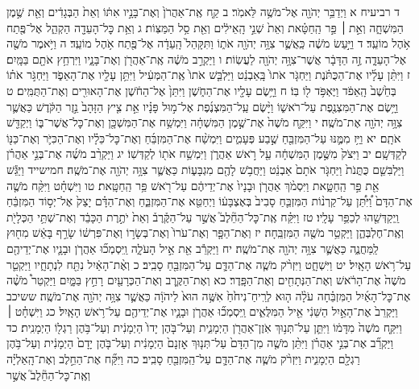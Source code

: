 \documentclass[twoside, openany, parskip=half, 11pt]{book}
\begin{document}
ד רביעיח א וַיְדַבֵּ֥ר יְהֹוָ֖ה אֶל־מֹשֶׁ֥ה לֵּאמֹֽר׃ ב קַ֤ח אֶֽת־אַהֲרֹן֙ וְאֶת־בָּנָ֣יו אִתּ֔וֹ וְאֵת֙ הַבְּגָדִ֔ים וְאֵ֖ת שֶׁ֣מֶן הַמִּשְׁחָ֑ה וְאֵ֣ת ׀ פַּ֣ר הַֽחַטָּ֗את וְאֵת֙ שְׁנֵ֣י הָֽאֵילִ֔ים וְאֵ֖ת סַ֥ל הַמַּצּֽוֹת׃ ג וְאֵ֥ת כׇּל־הָעֵדָ֖ה הַקְהֵ֑ל אֶל־פֶּ֖תַח אֹ֥הֶל מוֹעֵֽד׃ ד וַיַּ֣עַשׂ מֹשֶׁ֔ה כַּֽאֲשֶׁ֛ר צִוָּ֥ה יְהֹוָ֖ה אֹת֑וֹ וַתִּקָּהֵל֙ הָֽעֵדָ֔ה אֶל־פֶּ֖תַח אֹ֥הֶל מוֹעֵֽד׃ ה וַיֹּ֥אמֶר מֹשֶׁ֖ה אֶל־הָעֵדָ֑ה זֶ֣ה הַדָּבָ֔ר אֲשֶׁר־צִוָּ֥ה יְהֹוָ֖ה לַעֲשֽׂוֹת׃ ו וַיַּקְרֵ֣ב מֹשֶׁ֔ה אֶֽת־אַהֲרֹ֖ן וְאֶת־בָּנָ֑יו וַיִּרְחַ֥ץ אֹתָ֖ם בַּמָּֽיִם׃ ז וַיִּתֵּ֨ן עָלָ֜יו אֶת־הַכֻּתֹּ֗נֶת וַיַּחְגֹּ֤ר אֹתוֹ֙ בָּֽאַבְנֵ֔ט וַיַּלְבֵּ֤שׁ אֹתוֹ֙ אֶֽת־הַמְּעִ֔יל וַיִּתֵּ֥ן עָלָ֖יו אֶת־הָאֵפֹ֑ד וַיַּחְגֹּ֣ר אֹת֗וֹ בְּחֵ֙שֶׁב֙ הָֽאֵפֹ֔ד וַיֶּאְפֹּ֥ד ל֖וֹ בּֽוֹ׃ ח וַיָּ֥שֶׂם עָלָ֖יו אֶת־הַחֹ֑שֶׁן וַיִּתֵּן֙ אֶל־הַחֹ֔שֶׁן אֶת־הָאוּרִ֖ים וְאֶת־הַתֻּמִּֽים׃ ט וַיָּ֥שֶׂם אֶת־הַמִּצְנֶ֖פֶת עַל־רֹאשׁ֑וֹ וַיָּ֨שֶׂם עַֽל־הַמִּצְנֶ֜פֶת אֶל־מ֣וּל פָּנָ֗יו אֵ֣ת צִ֤יץ הַזָּהָב֙ נֵ֣זֶר הַקֹּ֔דֶשׁ כַּאֲשֶׁ֛ר צִוָּ֥ה יְהֹוָ֖ה אֶת־מֹשֶֽׁה׃ י וַיִּקַּ֤ח מֹשֶׁה֙ אֶת־שֶׁ֣מֶן הַמִּשְׁחָ֔ה וַיִּמְשַׁ֥ח אֶת־הַמִּשְׁכָּ֖ן וְאֶת־כׇּל־אֲשֶׁר־בּ֑וֹ וַיְקַדֵּ֖שׁ אֹתָֽם׃ יא וַיַּ֥ז מִמֶּ֛נּוּ עַל־הַמִּזְבֵּ֖חַ שֶׁ֣בַע פְּעָמִ֑ים וַיִּמְשַׁ֨ח אֶת־הַמִּזְבֵּ֜חַ וְאֶת־כׇּל־כֵּלָ֗יו וְאֶת־הַכִּיֹּ֛ר וְאֶת־כַּנּ֖וֹ לְקַדְּשָֽׁם׃ יב וַיִּצֹק֙ מִשֶּׁ֣מֶן הַמִּשְׁחָ֔ה עַ֖ל רֹ֣אשׁ אַהֲרֹ֑ן וַיִּמְשַׁ֥ח אֹת֖וֹ לְקַדְּשֽׁוֹ׃ יג וַיַּקְרֵ֨ב מֹשֶׁ֜ה אֶת־בְּנֵ֣י אַהֲרֹ֗ן וַיַּלְבִּשֵׁ֤ם כֻּתֳּנֹת֙ וַיַּחְגֹּ֤ר אֹתָם֙ אַבְנֵ֔ט וַיַּחֲבֹ֥שׁ לָהֶ֖ם מִגְבָּע֑וֹת כַּאֲשֶׁ֛ר צִוָּ֥ה יְהֹוָ֖ה אֶת־מֹשֶֽׁה׃ חמישייד וַיַּגֵּ֕שׁ אֵ֖ת פַּ֣ר הַֽחַטָּ֑את וַיִּסְמֹ֨ךְ אַהֲרֹ֤ן וּבָנָיו֙ אֶת־יְדֵיהֶ֔ם עַל־רֹ֖אשׁ פַּ֥ר הַֽחַטָּֽאת׃ טו וַיִּשְׁחָ֗ט וַיִּקַּ֨ח מֹשֶׁ֤ה אֶת־הַדָּם֙ וַ֠יִּתֵּ֠ן עַל־קַרְנ֨וֹת הַמִּזְבֵּ֤חַ סָבִיב֙ בְּאֶצְבָּע֔וֹ וַיְחַטֵּ֖א אֶת־הַמִּזְבֵּ֑חַ וְאֶת־הַדָּ֗ם יָצַק֙ אֶל־יְס֣וֹד הַמִּזְבֵּ֔חַ וַֽיְקַדְּשֵׁ֖הוּ לְכַפֵּ֥ר עָלָֽיו׃ טז וַיִּקַּ֗ח אֶֽת־כׇּל־הַחֵ֘לֶב֮ אֲשֶׁ֣ר עַל־הַקֶּ֒רֶב֒ וְאֵת֙ יֹתֶ֣רֶת הַכָּבֵ֔ד וְאֶת־שְׁתֵּ֥י הַכְּלָיֹ֖ת וְאֶֽת־חֶלְבְּהֶ֑ן וַיַּקְטֵ֥ר מֹשֶׁ֖ה הַמִּזְבֵּֽחָה׃ יז וְאֶת־הַפָּ֤ר וְאֶת־עֹרוֹ֙ וְאֶת־בְּשָׂר֣וֹ וְאֶת־פִּרְשׁ֔וֹ שָׂרַ֣ף בָּאֵ֔שׁ מִח֖וּץ לַֽמַּחֲנֶ֑ה כַּאֲשֶׁ֛ר צִוָּ֥ה יְהֹוָ֖ה אֶת־מֹשֶֽׁה׃ יח וַיַּקְרֵ֕ב אֵ֖ת אֵ֣יל הָעֹלָ֑ה וַֽיִּסְמְכ֞וּ אַהֲרֹ֧ן וּבָנָ֛יו אֶת־יְדֵיהֶ֖ם עַל־רֹ֥אשׁ הָאָֽיִל׃ יט וַיִּשְׁחָ֑ט וַיִּזְרֹ֨ק מֹשֶׁ֧ה אֶת־הַדָּ֛ם עַל־הַמִּזְבֵּ֖חַ סָבִֽיב׃ כ וְאֶ֨ת־הָאַ֔יִל נִתַּ֖ח לִנְתָחָ֑יו וַיַּקְטֵ֤ר מֹשֶׁה֙ אֶת־הָרֹ֔אשׁ וְאֶת־הַנְּתָחִ֖ים וְאֶת־הַפָּֽדֶר׃ כא וְאֶת־הַקֶּ֥רֶב וְאֶת־הַכְּרָעַ֖יִם רָחַ֣ץ בַּמָּ֑יִם וַיַּקְטֵר֩ מֹשֶׁ֨ה אֶת־כׇּל־הָאַ֜יִל הַמִּזְבֵּ֗חָה עֹלָ֨ה ה֤וּא לְרֵֽיחַ־נִיחֹ֙חַ֙ אִשֶּׁ֥ה הוּא֙ לַיהֹוָ֔ה כַּאֲשֶׁ֛ר צִוָּ֥ה יְהֹוָ֖ה אֶת־מֹשֶֽׁה׃ ששיכב וַיַּקְרֵב֙ אֶת־הָאַ֣יִל הַשֵּׁנִ֔י אֵ֖יל הַמִּלֻּאִ֑ים וַֽיִּסְמְכ֞וּ אַהֲרֹ֧ן וּבָנָ֛יו אֶת־יְדֵיהֶ֖ם עַל־רֹ֥אשׁ הָאָֽיִל׃ כג וַיִּשְׁחָ֓ט ׀ וַיִּקַּ֤ח מֹשֶׁה֙ מִדָּמ֔וֹ וַיִּתֵּ֛ן עַל־תְּנ֥וּךְ אֹֽזֶן־אַהֲרֹ֖ן הַיְמָנִ֑ית וְעַל־בֹּ֤הֶן יָדוֹ֙ הַיְמָנִ֔ית וְעַל־בֹּ֥הֶן רַגְל֖וֹ הַיְמָנִֽית׃ כד וַיַּקְרֵ֞ב אֶת־בְּנֵ֣י אַהֲרֹ֗ן וַיִּתֵּ֨ן מֹשֶׁ֤ה מִן־הַדָּם֙ עַל־תְּנ֤וּךְ אׇזְנָם֙ הַיְמָנִ֔ית וְעַל־בֹּ֤הֶן יָדָם֙ הַיְמָנִ֔ית וְעַל־בֹּ֥הֶן רַגְלָ֖ם הַיְמָנִ֑ית וַיִּזְרֹ֨ק מֹשֶׁ֧ה אֶת־הַדָּ֛ם עַל־הַֽמִּזְבֵּ֖חַ סָבִֽיב׃ כה וַיִּקַּ֞ח אֶת־הַחֵ֣לֶב וְאֶת־הָֽאַלְיָ֗ה וְאֶֽת־כׇּל־הַחֵ֘לֶב֮ אֲשֶׁ֣ר 
\end{document}
